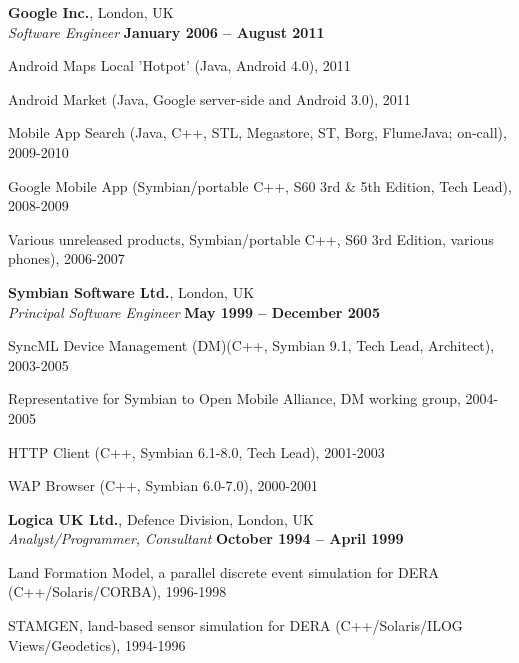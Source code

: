 \documentclass[line]{resume}
\begin{document}
\begin{resume}
    \textbf{Google Inc.}, London, UK \vspace{2mm}\\\vspace{1mm}%
    \textsl{Software Engineer} \hfill \textbf{January 2006 -- August 2011}\vspace{-3mm}\\\vspace{-1mm}%
    \begin{list2}
        \item Android Maps Local 'Hotpot' (Java,  Android 4.0), 2011
        \item Android Market (Java,  Google server-side and Android 3.0), 2011
        \item Mobile App Search (Java, C++, STL, Megastore, ST, Borg, FlumeJava; on-call), 2009-2010
        \item Google Mobile App (Symbian/portable C++, S60 3rd \& 5th Edition, Tech Lead), 2008-2009
        \item Various unreleased products, Symbian/portable C++, S60 3rd Edition, various phones), 2006-2007
    \end{list2}\vspace{-1.5mm}

    \textbf{Symbian Software Ltd.}, London, UK \vspace{2mm}\\\vspace{1mm}%
    \textsl{Principal Software Engineer} \hfill \textbf{May 1999 -- December 2005}\vspace{-3mm}\\\vspace{-1mm}%
    \begin{list2}
        \item SyncML Device Management (DM)(C++, Symbian 9.1, Tech Lead, Architect), 2003-2005
        \item Representative for Symbian to Open Mobile Alliance, DM working group, 2004-2005
        \item HTTP Client (C++, Symbian 6.1-8.0, Tech Lead), 2001-2003
        \item WAP Browser (C++, Symbian 6.0-7.0), 2000-2001
    \end{list2}\vspace{-1.5mm}

    \textbf{Logica UK Ltd.}, Defence Division, London, UK \vspace{2mm}\\\vspace{1mm}%
    \textsl{Analyst/Programmer, Consultant} \hfill \textbf{October 1994 -- April 1999}\vspace{-3mm}\\\vspace{-1mm}%
    \begin{list2}
        \item Land Formation Model, a parallel discrete event simulation for DERA (C++/Solaris/CORBA), 1996-1998
        \item STAMGEN, land-based sensor simulation for DERA (C++/Solaris/ILOG Views/Geodetics), 1994-1996
    \end{list2}\vspace{-1.5mm}


\end{resume}
\end{document}
